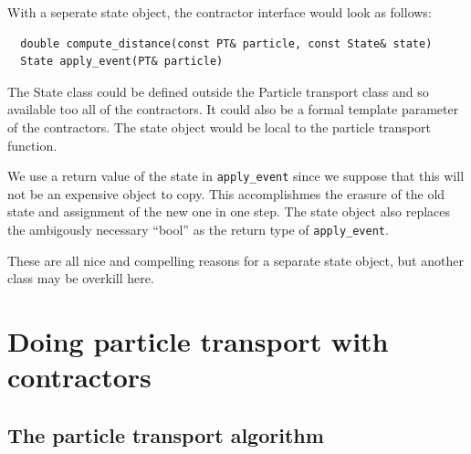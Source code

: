 \documentclass[memo]{ResearchNote}
\begin{document}
With a seperate state object, the contractor interface would look as
follows:

\begin{verbatim}
  double compute_distance(const PT& particle, const State& state)
  State apply_event(PT& particle)
\end{verbatim}

The State class could be defined outside the Particle transport class
and so available too all of the contractors. It could also be a formal
template parameter of the contractors.  The state object would be
local to the particle transport function. 

We use a return value of the state in {\tt apply\_event} since we
suppose that this will not be an expensive object to copy. This
accomplishmes the erasure of the old state and assignment of the new
one in one step. The state object also replaces the ambigously
necessary ``bool'' as the return type of {\tt apply\_event}.

These are all nice and compelling reasons for a separate state object,
but another class may be overkill here.

\section{Doing particle transport with contractors}
\label{sec:particle_transport}

\subsection{The particle transport algorithm}
\end{document}
